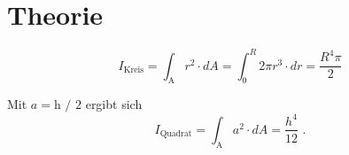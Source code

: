 \section{Theorie}
\label{sec:Theorie}


\begin{equation}\label{eq:FlTreagKreis}
        I_\text{Kreis} = \int_\text{A} r^2 \cdot dA = \int_0^R 2 \pi r^3 \cdot dr = \frac{R^4 \pi}{2}
\end{equation}

Mit $a = \text{h / 2}$ ergibt sich
\begin{equation}\label{eq:FlTreagQuadrat}
I_\text{Quadrat} = \int_\text{A} a^2 \cdot dA = \frac{h^4} {12} \text{ .}
\end{equation}